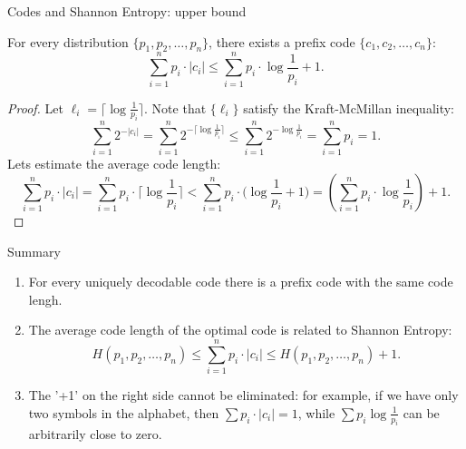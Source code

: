 \documentclass[handout,aspectratio=169]{beamer}
\newcommand{\seqn}[2]{{#1}_1,{#1}_2,\dotsc,{#1}_{#2}}
\begin{document}
    \begin{frame}{Codes and Shannon Entropy: upper bound}
        \begin{theorem}[Shannon]\label{thm:shannon:optcode}
            For every distribution \(\{\seqn{p}{n}\}\), there exists
            a prefix code \(\{\seqn{c}{n}\}\):
            \[
            \sum_{i=1}^n p_i \cdot |c_i| \le \sum_{i=1}^n p_i \cdot \log \frac{1}{p_i} + 1.
            \]
        \end{theorem}\vspace{-5mm}
        \begin{proof}
            Let \(\ell_i = \bigl\lceil \log \frac{1}{p_i} \bigr\rceil\). Note that \(\{
            \ell_i\}\) satisfy
            the Kraft-McMillan inequality:
            \[
            \sum_{i=1}^n 2^{-|c_i|} =
            \sum_{i=1}^n 2^{-\lceil \log \frac{1}{p_i} \rceil} \le
            \sum_{i=1}^n 2^{-\log \frac{1}{p_i}} =
            \sum_{i=1}^n p_i = 1.
            \]
            Lets estimate the average code length:
            \[
            \sum_{i=1}^n p_i \cdot |c_i| =
            \sum_{i=1}^n p_i \cdot \bigl\lceil \log{\textstyle\frac{1}{p_i}} \bigr\rceil <
            \sum_{i=1}^n p_i \cdot \bigl(\log{\textstyle\frac{1}{p_i}} + 1\bigr) =
            \left(\sum_{i=1}^n p_i \cdot \log{\textstyle\frac{1}{p_i}}\right) + 1.
            \]
        \end{proof}
    \end{frame}

    \begin{frame}{Summary}
        \begin{enumerate}
            \item For every uniquely decodable code there is a prefix code with
            the same code lengh.
            \item The average code length of the optimal code is related to Shannon Entropy:
            \[
            H(\seqn{p}{n}) \le \sum_{i=1}^{n} p_i\cdot |c_i| \le H(\seqn{p}{n}) +1.
            \]
            \item
            The '+1' on the right side cannot be eliminated: for example, if we have only two symbols in
            the alphabet, then \(\sum p_i \cdot |c_i| = 1\), while \(\sum
            p_i \log \frac{1}{p_i}\) can be arbitrarily close to zero.

        \end{enumerate}
    \end{frame}
\end{document}
